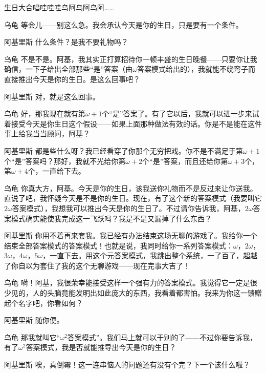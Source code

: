\begin{dialog}{生日大合唱哇哇哇乌阿乌阿乌阿……}
\begin{dialogue}
\item[乌龟]等会儿——别这么急。我会承认今天是你的生日，只是要有一个条件。

\item[阿基里斯]什么条件？是我不要礼物吗？

\item[乌龟]不是不是。阿基，我其实正打算招待你一顿丰盛的生日晚餐——只要你让我确信，一下子给出全部那些“是”答案（由$\omega$答案模式给出的），我就能不绕弯子而直接推出今天是你的生日。是这么回事吧？

\item[阿基里斯]对，就是这么回事。

\item[乌龟]好，那我现在就有第$\omega+1$个“是”答案了。有了它以后，我就可以进一步来试着接受今天是你生日这个假设——如果上面那种做法有效的话。你是不是能在这件事上给我当当顾问，阿基？

\item[阿基里斯]都是些什么呀？我已经看穿了你那个无穷把戏。你不是不满足于第$\omega+1$个“是”答案吗？那好，我就不光给你第$\omega+2$个“是”答案，而且还给你第$\omega+3$个，第$\omega+4$个，一直给下去。

\item[乌龟]你真大方，阿基。今天是你的生日，该我送你礼物而不是反过来让你送我。直说了吧，我怀疑今天是不是你的生日。现在，有了这个新的答案模式（我要叫它$2\omega$答案模式），我想我可以推出今天是你的生日了。不过请你告诉我，阿基，$2\omega$答案模式确实能使我完成这一飞跃吗？我是不是又漏掉了什么东西？

\item[阿基里斯]你用不着再来套我。我已经有办法结束这场无聊的游戏了。我给你一个结束全部答案模式的答案模式！也就是说，我同时给你一系列答案模式：$\omega$，$2\omega$，$3\omega$，$4\omega$，$5\omega$，一直下去。用这个元答案模式，我跳出整个系统，一了百了，超越了你自以为套住了我的这个无聊游戏——现在完事大吉了！

\item[乌龟]嗬！阿基，我很荣幸能接受这样一个强有力的答案模式。我觉得它一定是很少见的，人的头脑竟能发明出如此庞大的东西，我看着都害怕。我来为你这一馈赠起个名字吧，你看如何？

\item[阿基里斯]随你便。

\item[乌龟]那我就叫它“$\omega^2$答案模式”。我们马上就可以干别的了——不过你要告诉我，有了$\omega^2$答案模式，我是否就能推导出今天是你的生日？

\item[阿基里斯]唉，真倒霉！这一连串恼人的问题还有没有个完？下一个该什么啦？


\end{dialogue}
\end{dialog}
